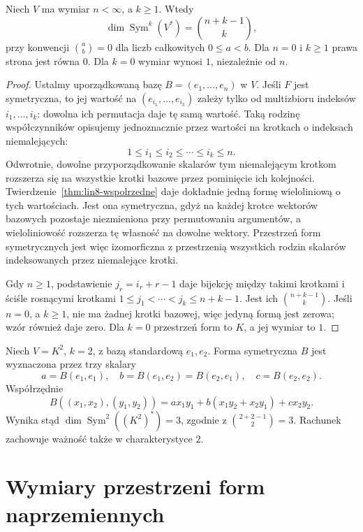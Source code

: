 \begin{twierdzenie}
\label{thm:lin8-wymiar-sym}
Niech \(V\) ma wymiar \(n<\infty\),
a \(k\geq1\).
Wtedy
\[
 \dim\operatorname{Sym}^k(V^*)
 =\binom{n+k-1}{k},
\]
przy konwencji
\(\binom{a}{b}=0\)
dla liczb całkowitych
\(0\leq a<b\).
Dla \(n=0\) i \(k\geq1\)
prawa strona jest równa \(0\).
Dla \(k=0\) wymiar wynosi \(1\),
niezależnie od \(n\).
\end{twierdzenie}
\begin{proof}
Ustalmy uporządkowaną bazę
\(B=(e_1,\ldots,e_n)\) w \(V\).
Jeśli \(F\) jest symetryczna,
to jej wartość na
\((e_{i_1},\ldots,e_{i_k})\)
zależy tylko od multizbioru
indeksów \(i_1,\ldots,i_k\):
dowolna ich permutacja
daje tę samą wartość.
Taką rodzinę współczynników
opisujemy jednoznacznie
przez wartości na krotkach
o indeksach niemalejących:
\[
 1\leq i_1\leq i_2\leq\cdots\leq i_k\leq n.
\]
Odwrotnie, dowolne przyporządkowanie
skalarów tym niemalejącym krotkom
rozszerza się na wszystkie
krotki bazowe przez pominięcie
ich kolejności.
Twierdzenie~\ref{thm:lin8-wspolrzedne}
daje dokładnie jedną formę
wieloliniową o tych wartościach.
Jest ona symetryczna, gdyż
na każdej krotce wektorów bazowych
pozostaje niezmieniona
przy permutowaniu argumentów,
a wieloliniowość rozszerza
tę własność na dowolne wektory.
Przestrzeń form symetrycznych
jest więc izomorficzna z
przestrzenią wszystkich rodzin
skalarów indeksowanych przez
niemalejące krotki.

Gdy \(n\geq1\), podstawienie
\(j_r=i_r+r-1\) daje bijekcję
między takimi krotkami i
ściśle rosnącymi krotkami
\(1\leq j_1<\cdots<j_k\leq n+k-1\).
Jest ich \(\binom{n+k-1}{k}\).
Jeśli \(n=0\), a \(k\geq1\),
nie ma żadnej krotki bazowej,
więc jedyną formą jest zerowa;
wzór również daje zero.
Dla \(k=0\) przestrzeń form
to \(K\), a jej wymiar to \(1\).
\end{proof}

\begin{przyklad}
\label{prz:lin8-sym-baza}
Niech \(V=K^2\), \(k=2\),
z bazą standardową \(e_1,e_2\).
Forma symetryczna \(B\)
jest wyznaczona przez
trzy skalary
\[
 a=B(e_1,e_1),\quad
 b=B(e_1,e_2)=B(e_2,e_1),\quad
 c=B(e_2,e_2).
\]
Współrzędnie
\[
 B((x_1,x_2),(y_1,y_2))
 =ax_1y_1+
 b(x_1y_2+x_2y_1)+cx_2y_2.
\]
Wynika stąd
\(\dim\operatorname{Sym}^2((K^2)^*)=3\),
zgodnie z
\(\binom{2+2-1}{2}=3\).
Rachunek zachowuje ważność
także w charakterystyce \(2\).
\end{przyklad}

\section{Wymiary przestrzeni form naprzemiennych}
\label{sec:lin8-wymiar-alt}

